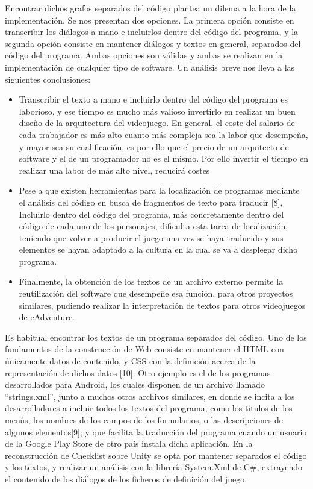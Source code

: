 Encontrar dichos grafos separados del código plantea un dilema a la hora de la implementación. Se nos presentan dos opciones. La primera opción consiste en transcribir los diálogos a mano e incluirlos dentro del código del programa, y la segunda opción consiste en mantener diálogos y textos en general, separados del código del programa. Ambas opciones son válidas y ambas se realizan en la implementación de cualquier tipo de software. Un análisis breve nos lleva a las siguientes conclusiones: 

\begin{itemize}
	\item 
	Transcribir el texto a mano e incluirlo dentro del código del programa es laborioso, y ese tiempo es mucho más valioso invertirlo en realizar un buen diseño de la arquitectura del videojuego. En general, el coste del salario de cada trabajador es más alto cuanto más compleja sea la labor que desempeña, y mayor sea su cualificación, es por ello que el precio de un arquitecto de software y el de un programador no es el mismo. Por ello invertir el tiempo en realizar una labor de más alto nivel, reducirá costes
	\item 
	Pese a que existen herramientas para la localización de programas mediante el análisis del código en busca de fragmentos de texto para traducir [8], Incluirlo dentro del código del programa, más concretamente dentro del código de cada uno de los personajes, dificulta esta tarea de localización, teniendo que volver a producir el juego una vez se haya traducido y sus elementos se hayan adaptado a la cultura en la cual se va a desplegar dicho programa. 
	\item
	Finalmente, la obtención de los textos de un archivo externo permite la reutilización del software que desempeñe esa función, para otros proyectos similares, pudiendo realizar la interpretación de textos para otros videojuegos de eAdventure. 
\end{itemize}

Es habitual encontrar los textos de un programa separados del código. Uno de los fundamentos de la construcción de Web consiste en mantener el HTML con únicamente datos de contenido, y CSS con la definición acerca de la representación de dichos datos [10]. Otro ejemplo es el de los programas desarrollados para Android, los cuales disponen de un archivo llamado “strings.xml”, junto a muchos otros archivos similares, en donde se incita a los desarrolladores a incluir todos los textos del programa, como los títulos de los menús, los nombres de los campos de los formularios, o las descripciones de algunos elementos[9]; y que facilita la traducción del programa cuando un usuario de la Google Play Store de otro país instala dicha aplicación. En la reconstrucción de Checklist sobre Unity se opta por mantener separados el código y los textos, y realizar un análisis con la librería System.Xml de C\#, extrayendo el contenido de los diálogos de los ficheros de definición del juego. 

